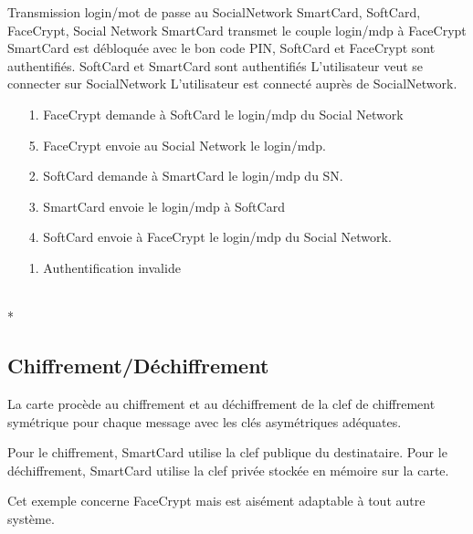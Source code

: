 \documentclass[a4paper,11pt,french]{article}
\begin{document}
\fiche
{Transmission login/mot de passe au SocialNetwork}
	{SmartCard, SoftCard, FaceCrypt, Social Network}
    {SmartCard transmet le couple login/mdp à FaceCrypt}
	{SmartCard est débloquée avec le bon code PIN, SoftCard et FaceCrypt sont 
    authentifiés. SoftCard et SmartCard sont authentifiés}
    {L'utilisateur veut se connecter sur SocialNetwork}
    {L'utilisateur est connecté auprès de SocialNetwork.}
    {\begin{itemize}
        \item[]
        \item[1.] FaceCrypt demande à SoftCard le login/mdp du Social Network
        \item[5.] FaceCrypt envoie au Social Network le login/mdp.
    \end{itemize}
    }
	{\begin{itemize}
        \item[]
		\item[2.] SoftCard demande à SmartCard le login/mdp du SN.
		\item[3.] SmartCard envoie le login/mdp à SoftCard
        \item[4.] SoftCard envoie à FaceCrypt le login/mdp du Social Network.
	\end{itemize}
	}
	{}
\flots
    {}
    {\begin{itemize}
    \item[]
    \item[1.] Authentification invalide
    \end{itemize}
    }
	{}    
\\*

\subsection{Chiffrement/Déchiffrement}
La carte procède au chiffrement et au déchiffrement de la clef de chiffrement 
symétrique pour chaque message avec les clés asymétriques adéquates.

Pour le chiffrement, SmartCard utilise la clef publique du destinataire. 
Pour le déchiffrement, SmartCard utilise la clef privée stockée en mémoire sur
la carte.

Cet exemple concerne FaceCrypt mais est aisément adaptable à tout autre système.
\end{document}
